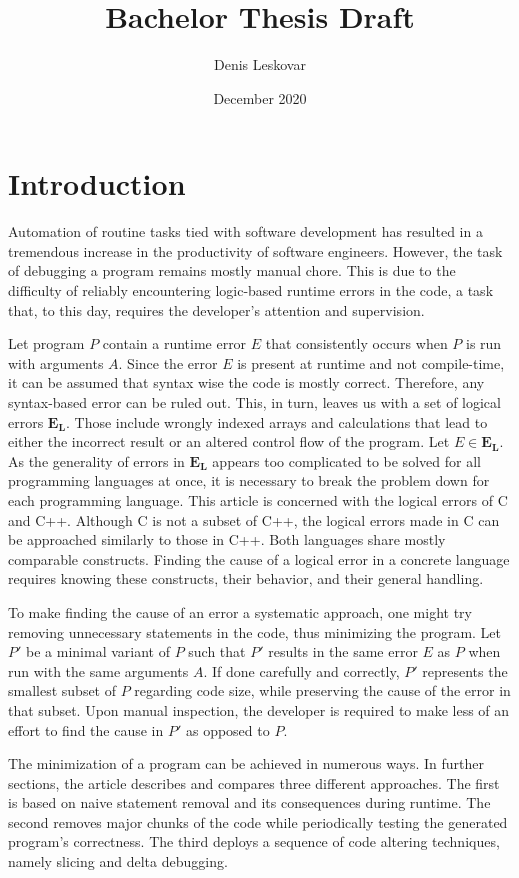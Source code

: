 \documentclass{article}
\title{Bachelor Thesis Draft}
\author{Denis Leskovar}
\date{December 2020}
\begin{document}
\maketitle

\section{Introduction}
Automation of routine tasks tied with software development has resulted in a tremendous
increase in the productivity of software engineers. However, the task of debugging a program
remains mostly manual chore. This is due to the difficulty of reliably encountering logic-based
runtime errors in the code, a task that, to this day, requires the developer's attention and
supervision. \par
Let program $P$ contain a runtime error $E$ that consistently occurs when $P$ is run with arguments $A$. Since the error $E$ is present at runtime and not compile-time, it can be assumed that syntax wise the code is mostly correct. Therefore, any syntax-based error can be ruled out. This, in turn, leaves us with a set of logical errors $\mathbf{E_L}$. Those include wrongly indexed arrays and calculations
that lead to either the incorrect result or an altered control flow of the program. Let $E \in \mathbf{E_L}$. As the generality of errors in $\mathbf{E_L}$ appears too complicated to be solved for all programming languages at once, it is necessary to break the problem down for each programming language. This article is concerned with the logical errors of C and C++. Although C is not a subset of C++, the logical errors made in C can be approached similarly to those in C++. Both languages share mostly comparable constructs. Finding the cause of a logical error in a concrete language requires knowing these constructs, their behavior, and their general handling. \par
To make finding the cause of an error a systematic approach, one might try removing
unnecessary statements in the code, thus minimizing the program. Let $P'$ be a minimal variant of $P$ such that $P'$ results in the same error $E$ as $P$ when run with the same arguments $A$. If done carefully and correctly, $P'$ represents the smallest subset of $P$ regarding code size, while preserving the cause of the error in that subset. Upon manual inspection, the developer is
required to make less of an effort to find the cause in $P'$ as opposed to $P$. \par
The minimization of a program can be achieved in numerous ways. In further sections, the article
describes and compares three different approaches. The first is based on naive statement removal
and its consequences during runtime. The second removes major chunks of the code while
periodically testing the generated program's correctness. The third deploys a sequence of code
altering techniques, namely slicing and delta debugging.
\end{document}
